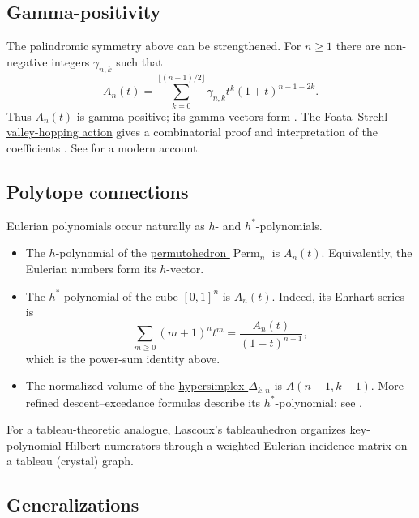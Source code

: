 \subsection[eulerianGamma]{Gamma-positivity}

The palindromic symmetry above can be strengthened.  For $n\geq1$ there are
non-negative integers $\gamma_{n,k}$ such that
\begin{equation}
 A_n(t)=\sum_{k=0}^{\lfloor(n-1)/2\rfloor}
 \gamma_{n,k}t^k(1+t)^{n-1-2k}.
\end{equation}
Thus $A_n(t)$ is \hyperref[gammaPositivePolynomial]{gamma-positive}; its
gamma-vectors form .  The
\hyperref[foataStrehlAction]{Foata--Strehl valley-hopping action} gives a
combinatorial proof and interpretation of the coefficients
\cite{FoataSchutzenberger1970}.  See
\cite[Ch.~4]{Petersen2015EulerianNumbers} for a modern account.


\subsection[eulerianGeometry]{Polytope connections}

Eulerian polynomials occur naturally as $h$- and $h^*$-polynomials.
\begin{itemize}
\item The $h$-polynomial of the
\hyperref[permutohedron]{permutohedron $\operatorname{Perm}_n$} is $A_n(t)$.
Equivalently, the Eulerian numbers form its $h$-vector.

\item The \hyperref[hStarPolynomial]{$h^*$-polynomial} of the cube
$[0,1]^n$ is $A_n(t)$.  Indeed, its Ehrhart series is
\[
 \sum_{m\geq0}(m+1)^nt^m=\frac{A_n(t)}{(1-t)^{n+1}},
\]
which is the power-sum identity above.

\item The normalized volume of the
\hyperref[hypersimplex]{hypersimplex $\Delta_{k,n}$} is
$A(n-1,k-1)$.  More refined descent--excedance formulas describe its
$h^*$-polynomial; see \cite{Li2012}.
\end{itemize}

For a tableau-theoretic analogue, Lascoux's
\hyperref[lascouxTableauhedron]{tableauhedron} organizes key-polynomial
Hilbert numerators through a weighted Eulerian incidence matrix on a
tableau (crystal) graph.


\subsection[eulerianGeneralizations]{Generalizations}

